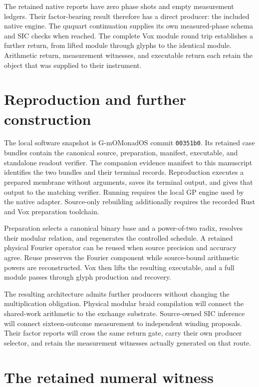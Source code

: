 \documentclass[12pt]{article}
\begin{document}
The retained native reports have zero phase shots and empty measurement ledgers. Their factor-bearing result therefore has a direct producer: the included native engine. The ququart continuation supplies its own measured-phase schema and SIC checks when reached. The complete Vox module round trip establishes a further return, from lifted module through glyphs to the identical module. Arithmetic return, measurement witnesses, and executable return each retain the object that was supplied to their instrument.

\section*{Reproduction and further construction}

The local software snapshot is G-mOMonadOS commit \texttt{00351b0}. Its retained case bundles contain the canonical source, preparation, manifest, executable, and standalone readout verifier. The companion evidence manifest to this manuscript identifies the two bundles and their terminal records. Reproduction executes a prepared membrane without arguments, saves its terminal output, and gives that output to the matching verifier. Running requires the local GP engine used by the native adapter. Source-only rebuilding additionally requires the recorded Rust and Vox preparation toolchain.

Preparation selects a canonical binary base and a power-of-two radix, resolves their modular relation, and regenerates the controlled schedule. A retained physical Fourier operator can be reused when source precision and accuracy agree. Reuse preserves the Fourier component while source-bound arithmetic powers are reconstructed. Vox then lifts the resulting executable, and a full module passes through glyph production and recovery.

The resulting architecture admits further producers without changing the multiplication obligation. Physical modular braid compilation will connect the shared-work arithmetic to the exchange substrate. Source-owned SIC inference will connect sixteen-outcome measurement to independent winding proposals. Their factor reports will cross the same return gate, carry their own producer selector, and retain the measurement witnesses actually generated on that route.

\section*{The retained numeral witness}
\end{document}

